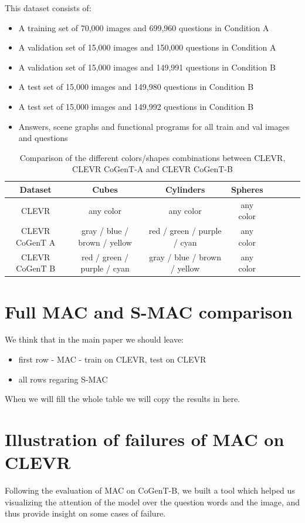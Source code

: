 This dataset consists of:
\begin{itemize}
\item	A training set of 70,000 images and 699,960 questions in Condition A
\item	A validation set of 15,000 images and 150,000 questions in Condition A
\item	A validation set of 15,000 images and 149,991 questions in Condition B
\item	A test set of 15,000 images and 149,980 questions in Condition B
\item	A test set of 15,000 images and 149,992 questions in Condition B
\item	Answers, scene graphs and functional programs for all train and val images and questions
\end{itemize}

\begin{table}
	\centering
	\begin{tabular}{ccccCcCc}
		\toprule
		Dataset        & Cubes              & Cylinders &  Spheres         \\
		\midrule
		CLEVR   &  any color &  any color        &    any color    \\
		CLEVR CoGenT A & gray / blue / brown / yellow  & red / green / purple / cyan       &    any color  \\
		CLEVR CoGenT B  & red / green / purple / cyan &   gray / blue / brown / yellow       &      any color  \\
		\bottomrule
	\end{tabular}
	\caption{Comparison of the different colors/shapes combinations between CLEVR, CLEVR CoGenT-A and CLEVR CoGenT-B  }
	\label{tab:parameters}
\end{table}

\section{Full MAC and S-MAC comparison}

We think that in the main paper we should leave:
\begin{itemize}
\item first row - MAC - train on CLEVR, test on CLEVR 
\item all rows regaring S-MAC
\end{itemize}

When we will fill the whole table we will copy the results in here.

\section{Illustration of failures of MAC on CLEVR}
Following the evaluation of MAC on CoGenT-B, we built a tool which helped us visualizing the attention of the model over the question words and the image, and thus provide insight on some cases of failure.

